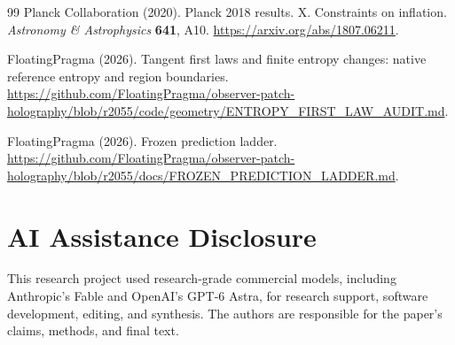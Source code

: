 \documentclass[11pt]{article}
\theoremstyle{remark}
\theoremstyle{plain}
\begin{document}
\begin{thebibliography}{99}
Planck Collaboration (2020). Planck 2018 results. X. Constraints on inflation.
\emph{Astronomy \& Astrophysics} \textbf{641}, A10.
\url{https://arxiv.org/abs/1807.06211}.

FloatingPragma (2026). Tangent first laws and finite entropy changes:
native reference entropy and region boundaries.
\url{https://github.com/FloatingPragma/observer-patch-holography/blob/r2055/code/geometry/ENTROPY_FIRST_LAW_AUDIT.md}.

FloatingPragma (2026). Frozen prediction ladder.
\url{https://github.com/FloatingPragma/observer-patch-holography/blob/r2055/docs/FROZEN_PREDICTION_LADDER.md}.

\end{thebibliography}

\section*{AI Assistance Disclosure}
This research project used research-grade commercial models, including
Anthropic's Fable and OpenAI's GPT-6 Astra, for research support, software
development, editing, and synthesis. The authors are responsible for the
paper's claims, methods, and final text.
\end{document}

